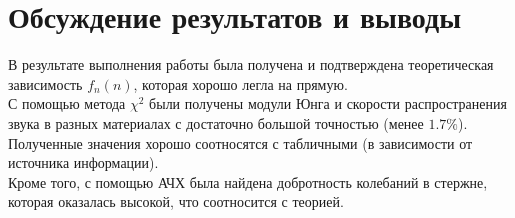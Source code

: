 \documentclass[a4paper,12pt]{article}
\begin{document}
	\section{Обсуждение результатов и выводы}
	В результате выполнения работы была получена и подтверждена теоретическая зависимость $f_n(n)$, которая хорошо легла на прямую.\\
	
	С помощью метода $\chi^2$ были получены модули Юнга и скорости распространения звука в разных материалах с достаточно большой точностью (менее $1.7\%$). Полученные значения хорошо соотносятся с табличными (в зависимости от источника информации).\\
	
	Кроме того, с помощью АЧХ была найдена добротность колебаний в стержне, которая оказалась высокой, что соотносится с теорией.\\
	
	
	
\end{document}

